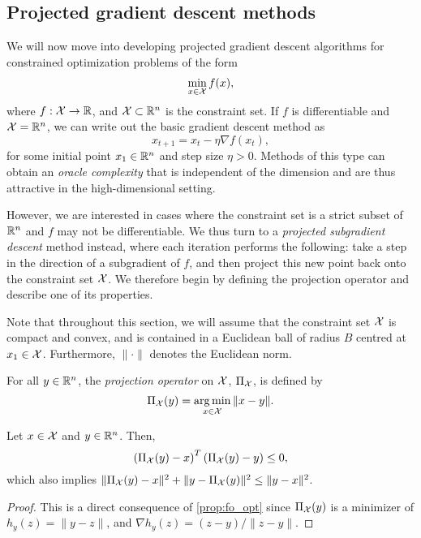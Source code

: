 \subsection{Projected gradient descent methods}
We will now move into developing projected gradient descent algorithms for constrained optimization problems of the form 
\begin{align*}
\min_{x \in \mathcal{X}} f(x),
\end{align*}
where $f : \mathcal{X} \rightarrow \mathbb{R}$, and $\mathcal{X} \subset \mathbb{R}^n$ is the constraint set. If $f$ is differentiable and $\mathcal{X} = \mathbb{R}^n$, we can write out the basic gradient descent method as 
\[
x_{t+1} = x_t - \eta \nabla f(x_t),
\]
for some initial point $x_1 \in \mathbb{R}^n$ and step size $\eta > 0$. Methods of this type can obtain an \emph{oracle complexity} that is independent of the dimension and are thus attractive in the high-dimensional setting. 

However, we are interested in cases where the constraint set is a strict subset of $\mathbb{R}^n$ and $f$ may not be differentiable. We thus turn to a \emph{projected subgradient descent} method instead, where each iteration performs the following: take a step in the direction of a subgradient of $f$, and then project this new point back onto the constraint set $\mathcal{X}$. We therefore begin by defining the projection operator and describe one of its properties.

Note that throughout this section, we will assume that the constraint set $\mathcal{X}$ is compact and convex, and is contained in a Euclidean ball of radius $B$ centred at $x_1 \in \mathcal{X}$. Furthermore, $\| \cdot \|$ denotes the Euclidean norm.

\begin{definition}
For all $y \in \mathbb{R}^n$, the \emph{projection operator} on $\mathcal{X}$, $\Pi_{\mathcal{X}}$, is defined by 
\[
\Pi_{\mathcal{X}}(y) = \operatorname*{arg\,min}_{x \in \mathcal{X}} \| x - y \|.
\]
\end{definition}

\begin{lemma} \label{lem:proj_grad}
Let $x \in \mathcal{X}$ and $y \in \mathbb{R}^n$. Then, 
\[
\left(\Pi_{\mathcal{X}}(y) - x\right)^T \left(\Pi_{\mathcal{X}}(y) - y\right) \leq 0,
\]
which also implies $\|\Pi_{\mathcal{X}}(y) - x\|^2 + \|y - \Pi_{\mathcal{X}}(y)\|^2 \leq \|y - x\|^2$. 
\begin{proof}
This is a direct consequence of \autoref{prop:fo_opt} since $\Pi_{\mathcal{X}}(y)$ is a minimizer of $h_{y}(z) = \| y - z \|$, and $\nabla h_y(z) = (z - y) / \|z - y \|$.
\end{proof}
\end{lemma}

